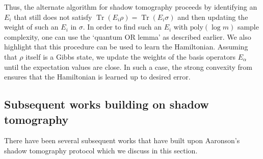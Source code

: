 \documentclass[11pt]{article}
\DeclareMathOperator{\tr}{Tr}
\begin{document}
Thus, the alternate algorithm for shadow tomography proceeds by identifying an $E_i$ that still does not satisfy $\tr(E_i\rho)=\tr(E_i\sigma)$ and then updating the weight of such an $E_i$ in $\sigma$. In order to find such an $E_i$ with $\text{poly}(\log m)$ sample complexity, one can use the `quantum OR lemma' as described earlier. We also highlight that this procedure can be used to learn the Hamiltonian. Assuming that $\rho$ itself is a Gibbs state, we update the weights of the basis operators $E_\alpha$ until the expectation values are close. In such a case, the strong convexity from \cite{anshu2021sample} ensures that the Hamiltonian is learned up to  desired error.


\subsection{Subsequent works building on shadow tomography}
\label{sec:subsequentshadow}

There have been several subsequent works that have built upon Aaronson's shadow tomography protocol which we discuss in this section.
\end{document}
